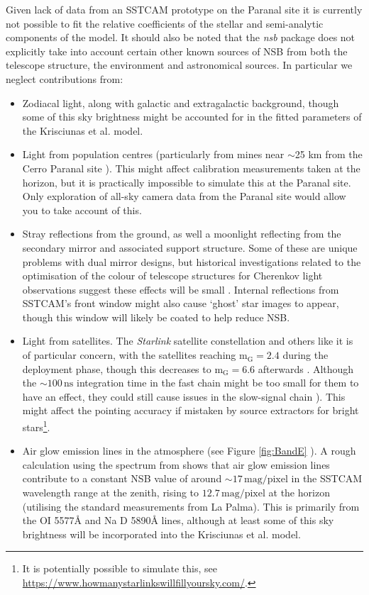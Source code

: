 Given lack of data from an SSTCAM prototype on the Paranal site it is currently not possible to fit the relative coefficients of the stellar and semi-analytic components of the model.  It should also be noted that the \textit{nsb} package does not explicitly take into account certain other known sources of NSB from both the telescope structure, the environment and astronomical sources. In particular we neglect contributions from:
\begin{itemize}
    \item Zodiacal light, along with galactic and extragalactic background, though some of this sky brightness might be accounted for in the fitted parameters of the Krisciunas et al. model.
    \item Light from population centres (particularly from mines near $\sim$25 km from the Cerro Paranal site \cite{cpmines}). This might affect calibration measurements taken at the horizon, but it is practically impossible to simulate this at the Paranal site. Only exploration of all-sky camera data from the Paranal site would allow you to take account of this.
    \item Stray reflections from the ground, as well a moonlight reflecting from the secondary mirror and associated support structure. Some of these are unique problems with dual mirror designs, but historical investigations related to the optimisation of the colour of telescope structures for Cherenkov light observations suggest these effects will be small \cite{pinktelescope}. Internal reflections from SSTCAM's front window might also cause `ghost' star images to appear, though this window will likely be coated to help reduce NSB.
    \item Light from satellites. The \textit{Starlink} satellite constellation and others like it is of particular concern, with the satellites reaching $\mathrm{m_G=2.4}$ during the deployment phase, though this decreases to $\mathrm{m_G=6.6}$ afterwards \cite{starlink}. Although the $\mathrm{\sim 100\,ns}$ integration time in the fast chain might be too small for them to have an effect, they could still cause issues in the slow-signal chain \cite{starlinkcta}). This might affect the pointing accuracy if mistaken by source extractors for bright stars\footnote{It is potentially possible to simulate this, see \url{https://www.howmanystarlinkswillfillyoursky.com/}.}.
    \item Air glow emission lines in the atmosphere (see Figure \ref{fig:BandE} \cite{BandE}). A rough calculation using the spectrum from \cite{BandE} shows that air glow emission lines contribute to a constant NSB value of around $\mathrm{\sim17\,mag/pixel}$ in the SSTCAM wavelength range at the zenith, rising to $\mathrm{12.7\,mag/pixel}$ at the horizon (utilising the standard \cite{BandE} measurements from La Palma). This is primarily from the OI 5577\r{A} and Na D 5890\r{A} lines, although at least some of this sky brightness will be incorporated into the Krisciunas et al. model.

\end{itemize}
